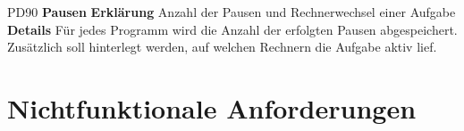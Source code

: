 \documentclass[a4paper,12pt]{article}
\begin{document}
\begin{itemize}[nosep]
\begin{minipage}[t]{\linewidth}
\item[PD90] \textbf{Pausen}
\subitem \textbf{Erklärung} Anzahl der Pausen und Rechnerwechsel einer Aufgabe
\subitem \textbf{Details} Für jedes Programm wird die Anzahl der erfolgten Pausen abgespeichert.\newline
Zusätzlich soll hinterlegt werden, auf welchen Rechnern die Aufgabe aktiv lief.
\end{minipage}

\end{itemize}
\newpage

\section{Nichtfunktionale Anforderungen}
\end{document}
